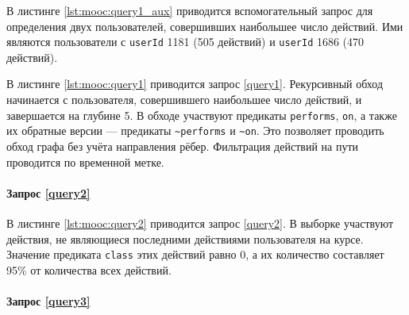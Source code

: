 В листинге \ref{lst:mooc:query1_aux} приводится вспомогательный запрос для определения двух пользователей, совершивших
наибольшее число действий. Ими являются пользователи с \texttt{userId} 1181 (505 действий) и \texttt{userId} 1686 (470
действий).


В листинге \ref{lst:mooc:query1} приводится запрос \ref{query1}. Рекурсивный обход начинается с пользователя,
совершившего наибольшее число действий, и завершается на глубине 5. В обходе участвуют предикаты \texttt{performs},
\texttt{on}, а также их обратные версии --- предикаты \texttt{\textasciitilde performs} и \texttt{\textasciitilde on}.
Это позволяет проводить обход графа без учёта направления рёбер. Фильтрация действий на пути проводится по временной
метке.


\paragraph{Запрос \ref{query2}}

В листинге \ref{lst:mooc:query2} приводится запрос \ref{query2}. В выборке участвуют действия, не являющиеся последними
действиями пользователя на курсе. Значение предиката \texttt{class} этих действий равно 0, а их количество составляет
95\% от количества всех действий.


\paragraph{Запрос \ref{query3}}

